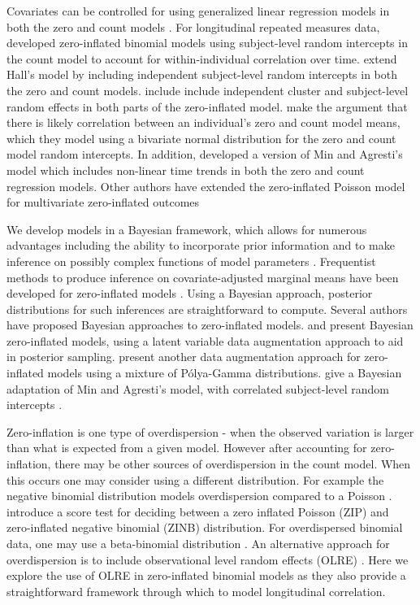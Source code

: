 \documentclass[12pt]{article}
\begin{document}
Covariates can be controlled for using generalized linear regression models in both the zero and count models \citep{mullahy1986specification, lambert1992zero, heilbron1994zero}. For longitudinal repeated measures data, \cite{hall2000zero} developed zero-inflated binomial models using subject-level random intercepts in the count model to account for within-individual correlation over time. \cite{yau2001zero} extend Hall's model by including independent subject-level random intercepts in both the zero and count models. \cite{lee2006multi} include include independent cluster and subject-level random effects in both parts of the zero-inflated model. \cite{min2005random} make the argument that there is likely correlation between an individual's zero and count model means, which they model using a bivariate normal distribution for the zero and count model random intercepts. In addition, \cite{buu2012statistical} developed a version of Min and Agresti's model which includes non-linear time trends in both the zero and count regression models. Other authors have extended the zero-inflated Poisson model for multivariate zero-inflated outcomes \cite{wu2023multivariate, liu2015type}

We develop models in a Bayesian framework, which allows for numerous advantages including the ability to incorporate prior information and to make inference on possibly complex functions of model parameters \citep{gelman2013bayesian}. Frequentist methods to produce inference on covariate-adjusted marginal means have been developed for zero-inflated models \citep{albert2014estimating, preisser2016marginalized}. Using a Bayesian approach, posterior distributions for such inferences are straightforward to compute. Several authors have proposed Bayesian approaches to zero-inflated models.  \cite{rodrigues2003bayesian} and \cite{ghosh2006bayesian} present Bayesian zero-inflated models, using a latent variable data augmentation approach to aid in posterior sampling. \cite{wen2024bayesian} present another data augmentation approach for zero-inflated models using a mixture of P\'{o}lya-Gamma distributions. \cite{neelon2010bayesian} give a Bayesian adaptation of Min and Agresti's model, with correlated subject-level random intercepts \citep{spiegelhalter1998bayesian, cooper2007predicting}.

Zero-inflation is one type of overdispersion - when the observed variation is larger than what is expected from a given model. However after accounting for zero-inflation, there may be other sources of overdispersion in the count model. When this occurs one may consider using a different distribution. For example the negative binomial distribution models overdispersion compared to a Poisson \citep{gardner1995regression}. \cite{hinde1998overdispersion} introduce a score test for deciding between a zero inflated Poisson (ZIP) and zero-inflated negative binomial (ZINB) distribution. For overdispersed binomial data, one may use a beta-binomial distribution \cite{hu2018zero, wen2024bayesian}. An alternative approach for overdispersion is to include observational level random effects (OLRE)  \cite{harrison2014using}. Here we explore the use of OLRE in zero-inflated binomial models as they also provide a straightforward framework through which to model longitudinal correlation.
\end{document}
